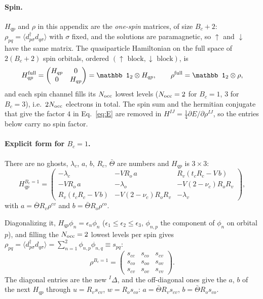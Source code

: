 \documentclass[11pt]{article}
\newcommand{\dg}{^{\dagger}}
\newcommand{\braket}[1]{\langle #1\rangle}
\begin{document}
\paragraph{Spin.} $H_{qp}$ and $\rho$ in this appendix are the \emph{one-spin} matrices, of size $B_c+2$: $\rho_{pq}=\braket{d\dg_{p\sigma}d_{q\sigma}}$ with $\sigma$ fixed, and the
solutions are paramagnetic, so $\uparrow$ and $\downarrow$ have the same matrix. The quasiparticle Hamiltonian on the full space of $2(B_c+2)$ spin orbitals, ordered
$(\uparrow\text{ block},\downarrow\text{ block})$, is
\begin{equation}
H_{qp}^{\rm full}=\begin{pmatrix}H_{qp}&0\\0&H_{qp}\end{pmatrix}=\mathbb 1_2\otimes H_{qp},\qquad
\rho^{\rm full}=\mathbb 1_2\otimes\rho ,
\end{equation}
and each spin channel fills its $N_{\rm occ}$ lowest levels ($N_{\rm occ}=2$ for $B_c=1$, $3$ for $B_c=3$), i.e.\ $2N_{\rm occ}$ electrons in total. The spin sum and the hermitian conjugate that give the factor $4$ in Eq.~\eqref{eq:E}
are removed in $H^{IJ}=\tfrac14\partial E/\partial\rho^{IJ}$, so the entries below carry no spin factor.

\paragraph{Explicit form for $B_c=1$.} There are no ghosts, $\lambda_c$, $a$, $b$, $R_c$, $\bar\Theta$ are numbers and $H_{qp}$ is $3\times3$:
\begin{equation}
H_{qp}^{B_c=1}=
\begin{pmatrix}
-\lambda_c & -V R_o\,a & R_v(t_cR_c-V\,b)\\
-V R_o\,a & -\lambda_o & -V(2-\nu_c)R_oR_v\\
R_v(t_cR_c-V\,b) & -V(2-\nu_c)R_oR_v & -\lambda_v
\end{pmatrix},
\end{equation}
with $a=\bar\Theta R_v\rho^{cv}$ and $b=\bar\Theta R_o\rho^{co}$.

Diagonalizing it, $H_{qp}\phi_n=\epsilon_n\phi_n$ ($\epsilon_1\le\epsilon_2\le\epsilon_3$, $\phi_{n,p}$ the component of $\phi_n$ on orbital $p$), and filling the
$N_{\rm occ}=2$ lowest levels per spin gives $\rho_{pq}=\braket{d\dg_{p\sigma}d_{q\sigma}}=\sum_{n=1}^{2}\phi_{n,p}\phi_{n,q}\equiv s_{pq}$:
\begin{equation}
\rho^{B_c=1}=
\begin{pmatrix}
s_{cc}&s_{co}&s_{cv}\\ s_{co}&s_{oo}&s_{ov}\\ s_{cv}&s_{ov}&s_{vv}
\end{pmatrix}.
\end{equation}
The diagonal entries are the new ${}^I\Delta$, and the off-diagonal ones give the $a$, $b$ of the next $H_{qp}$ through $u=R_vs_{cv}$, $w=R_os_{co}$:
$a=\bar\Theta R_vs_{cv}$, $b=\bar\Theta R_os_{co}$.
\end{document}
